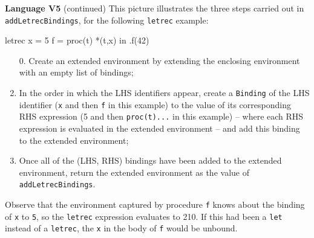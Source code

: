 \begin{minipage}[t]{\sw}
\slidenumber
\LARGE
{\bf Language V5} (continued)\exx
\large
This picture illustrates the three steps
carried out in \verb'addLetrecBindings',
for the following \verb'letrec' example:
\begin{qv}
letrec
    x = 5 
    f = proc(t) *(t,x)
in
    .f(42)
\end{qv}
\begin{enumerate}
\item [0.] Create an extended environment
      by extending the enclosing environment
      with an empty list of bindings;
\item In the order in which the LHS identifiers appear,
      create a \verb'Binding' of the LHS identifier
      (\verb'x' and then \verb'f' in this example)
      to the value of its corresponding RHS expression
      (5 and then \verb'proc(t)...' in this example) --
      where each RHS expression is evaluated
      in the extended environment --
      and add this binding to the extended environment;
\item Once all of the (LHS, RHS) bindings have been added
      to the extended environment,
      return the extended environment
      as the value of \verb'addLetrecBindings'.
\end{enumerate}
Observe that the environment captured by procedure \verb'f'
knows about the binding of \verb'x' to \verb'5',
so the \verb'letrec' expression evaluates to 210.
If this had been a \verb'let' instead of a \verb'letrec',
the \verb'x' in the body of \verb'f' would be unbound.
{\center\ \ \\}

\end{minipage}
\clearpage

